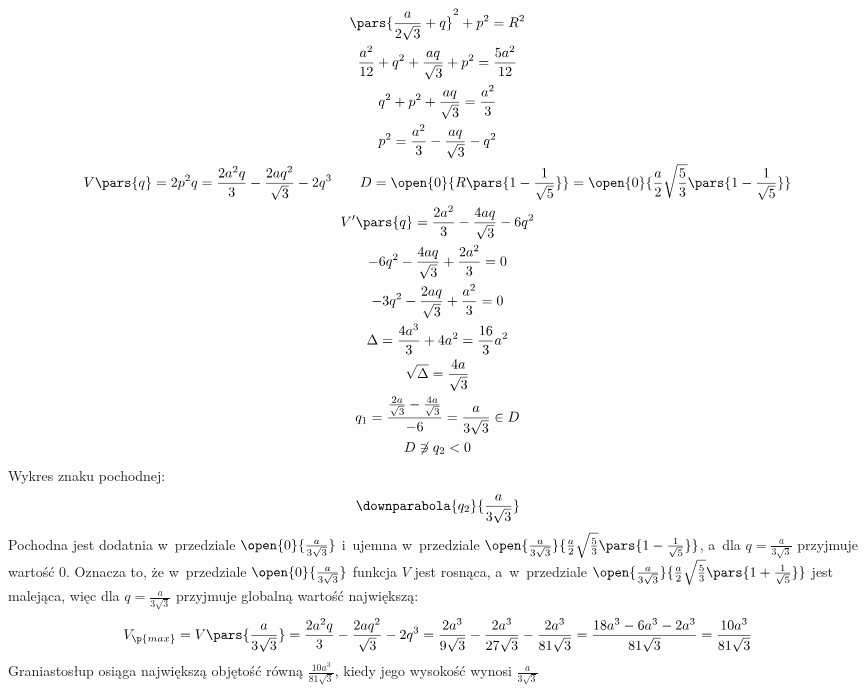 \begin{gather*}
    \pars{\frac{a}{2\sqrt{3}} + q}^2 + p^2 = R^2\\
    \frac{a^2}{12} + q^2 + \frac{aq}{\sqrt{3}} + p^2 = \frac{5a^2}{12}\\
    q^2 + p^2 + \frac{aq}{\sqrt{3}} = \frac{a^2}{3}\\
    p^2 = \frac{a^2}{3} - \frac{aq}{\sqrt{3}} - q^2\\
    V\pars{q}
    = 2p^2q
    = \frac{2a^2q}{3} - \frac{2aq^2}{\sqrt{3}} - 2q^3 \qquad D = \open{0}{R\pars{1 - \frac{1}{\sqrt{5}}}} = \open{0}{\frac{a}{2}\sqrt{\frac{5}{3}}\pars{1 - \frac{1}{\sqrt{5}}}}\\
    V'\pars{q}
    = \frac{2a^2}{3} - \frac{4aq}{\sqrt{3}} - 6q^2\\
    -6q^2 - \frac{4aq}{\sqrt{3}} + \frac{2a^2}{3} = 0\\
    -3q^2 - \frac{2aq}{\sqrt{3}} + \frac{a^2}{3} = 0\\
    \Delta
    = \frac{4a^3}{3} + 4a^2
    = \frac{16}{3}a^2\\
    \sqrt{\Delta} = \frac{4a}{\sqrt{3}}\\
    q_1 = \frac{\frac{2a}{\sqrt{3}} - \frac{4a}{\sqrt{3}}}{-6}
    = \frac{a}{3\sqrt{3}} \in D\\
    D \not\ni q_2 < 0\\
\end{gather*}
Wykres znaku pochodnej:
\begin{gather*}
    \downparabola{q_2}{\frac{a}{3\sqrt{3}}}
\end{gather*}
Pochodna jest dodatnia w~przedziale \(\open{0}{\frac{a}{3\sqrt{3}}}\) i~ujemna w~przedziale \(\open{\frac{a}{3\sqrt{3}}}{\frac{a}{2}\sqrt{\frac{5}{3}}\pars{1 - \frac{1}{\sqrt{5}}}}\), a~dla \(q = \frac{a}{3\sqrt{3}}\) przyjmuje wartość \(0\). Oznacza to, że w~przedziale \(\open{0}{\frac{a}{3\sqrt{3}}}\) funkcja \(V\) jest rosnąca, a~w~przedziale \(\open{\frac{a}{3\sqrt{3}}}{\frac{a}{2}\sqrt{\frac{5}{3}}\pars{1 + \frac{1}{\sqrt{5}}}}\) jest malejąca, więc dla \(q = \frac{a}{3\sqrt{3}}\) przyjmuje globalną wartość największą:
\begin{equation*}
    V_\p{max}
    = V\pars{\frac{a}{3\sqrt{3}}}
    = \frac{2a^2q}{3} - \frac{2aq^2}{\sqrt{3}} - 2q^3
    = \frac{2a^3}{9\sqrt{3}} - \frac{2a^3}{27\sqrt{3}} - \frac{2a^3}{81\sqrt{3}}
    = \frac{18a^3 - 6a^3 - 2a^3}{81\sqrt{3}}
    = \frac{10a^3}{81\sqrt{3}}
\end{equation*}
Graniastosłup osiąga największą objętość równą \(\frac{10a^3}{81\sqrt{3}}\), kiedy jego wysokość wynosi \(\frac{a}{3\sqrt{3}}\)
